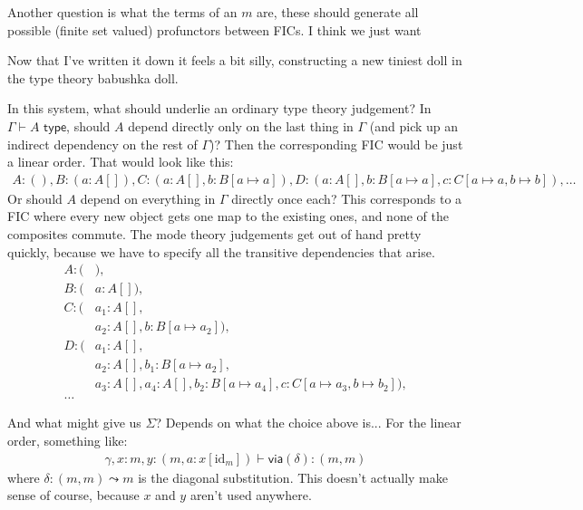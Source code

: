 \documentclass[10pt]{article}
\newcommand{\type}{\,\,\mathsf{type}}
\begin{document}
Another question is what the terms of an $m$ are, these should generate all possible (finite set valued) profunctors between FICs. I think we just want

Now that I've written it down it feels a bit silly, constructing a new tiniest doll in the type theory babushka doll.

In this system, what should underlie an ordinary type theory judgement? In $\Gamma \vdash A \type$, should $A$ depend directly only on the last thing in $\Gamma$ (and pick up an indirect dependency on the rest of $\Gamma$)? Then the corresponding FIC would be just a linear order. That would look like this:
\begin{align*}
A : (), B : (a : A[]), C : (a : A[], b : B[a \mapsto a]), D : (a : A[], b : B[a \mapsto a], c : C[a \mapsto a, b \mapsto b]), \dots
\end{align*}
Or should $A$ depend on everything in $\Gamma$ directly once each? This corresponds to a FIC where every new object gets one map to the existing ones, and none of the composites commute. The mode theory judgements get out of hand pretty quickly, because we have to specify all the transitive dependencies that arise. 
\begin{align*}
A : (&), \\
B : (&a : A[]), \\
C : (&a_1 : A[], \\
&a_2 : A[], b : B[a \mapsto a_2]), \\ 
D : (&a_1 : A[], \\
&a_2 : A[], b_1 : B[a \mapsto a_2],\\
&a_3 : A[], a_4 : A[], b_2 : B[a \mapsto a_4], c : C[a \mapsto a_3, b \mapsto b_2]), \\
\dots&
\end{align*}

And what might give us $\Sigma$? Depends on what the choice above is... For the linear order, something like:
\begin{align*}
\gamma, x : m, y : (m, a : x[\mathrm{id}_m]) \vdash \mathsf{via}(\delta) : (m, m)
\end{align*}
where $\delta : (m, m) \leadsto m$ is the diagonal substitution. This doesn't actually make sense of course, because $x$ and $y$ aren't used anywhere.
\end{document}
